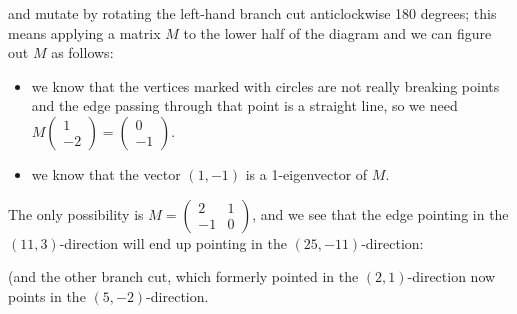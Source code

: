 \documentclass{article}
\begin{document}
\begin{center}
\end{center}
and mutate by rotating the left-hand branch cut anticlockwise 180
degrees; this means applying a matrix \(M\) to the lower half of the
diagram and we can figure out \(M\) as follows:
\begin{itemize}
\item we know that the vertices marked with circles are not really
breaking points and the edge passing through that point is a
straight line, so we need
\(M\begin{pmatrix}1\\-2\end{pmatrix}=\begin{pmatrix}0\\-1\end{pmatrix}\).
\item we know that the vector \((1,-1)\) is a 1-eigenvector of \(M\).
\end{itemize}
The only possibility is \(M=\begin{pmatrix}2 & 1 \\ -1 &
0\end{pmatrix}\), and we see that the edge pointing in the
\((11,3)\)-direction will end up pointing in the
\((25,-11)\)-direction:


\begin{center}
\end{center}
(and the other branch cut, which formerly pointed in the
\((2,1)\)-direction now points in the \((5,-2)\)-direction.
\end{document}
